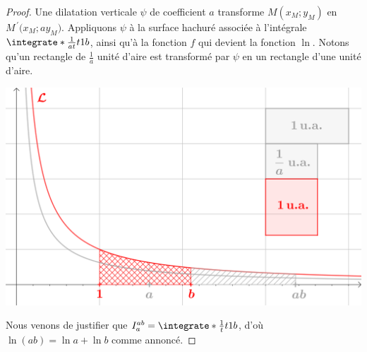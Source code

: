 \begin{proof}
	Une dilatation verticale $\psi$ de coefficient $a$ transforme $M(x_M ; y_M)$ en $M^{\,\prime}\big( x_M ; a y_M)$. 
	Appliquons $\psi$ à la surface hachuré associée à l'intégrale $\integrate*{\frac{1}{at}}{t}{1}{b}$, ainsi qu'à la fonction $f$ qui devient la fonction $\ln$. Notons qu'un rectangle de $\frac1a$ unité d'aire est transformé par $\psi$ en un rectangle d'une unité d'aire.

	\begin{center}
		\includegraphics[scale=.5]{content/ln/func-eq-3.png}
	\end{center}
	
	Nous venons de justifier que $I_{a}^{ab} = \integrate*{\frac{1}{t}}{t}{1}{b}$,
	d'où $\ln(a b) = \ln a + \ln b$ comme annoncé.
\end{proof}

